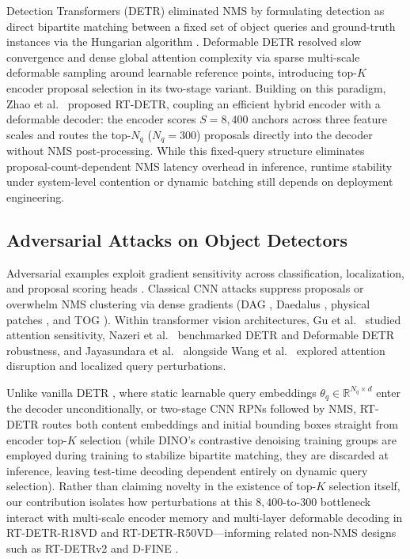 \documentclass[preprint,10pt]{elsarticle}
\begin{document}
Detection Transformers (DETR) \citep{carion2020end} eliminated NMS by formulating detection as direct bipartite matching between a fixed set of object queries and ground-truth instances via the Hungarian algorithm \citep{kuhn1955hungarian}. Deformable DETR \citep{zhu2020deformable} resolved slow convergence and dense global attention complexity via sparse multi-scale deformable sampling around learnable reference points, introducing top-$K$ encoder proposal selection in its two-stage variant. Building on this paradigm, Zhao et al.~\citep{zhao2024detrs} proposed RT-DETR, coupling an efficient hybrid encoder with a deformable decoder: the encoder scores $S = 8,400$ anchors across three feature scales and routes the top-$N_q$ ($N_q = 300$) proposals directly into the decoder without NMS post-processing. While this fixed-query structure eliminates proposal-count-dependent NMS latency overhead in inference, runtime stability under system-level contention or dynamic batching still depends on deployment engineering.

\subsection{Adversarial Attacks on Object Detectors}
Adversarial examples exploit gradient sensitivity across classification, localization, and proposal scoring heads \citep{goodfellow2014explaining, madry2018towards, carlini2017towards, li2020towards}. Classical CNN attacks suppress proposals or overwhelm NMS clustering via dense gradients (DAG \citep{xie2017adversarial}, Daedalus \citep{wang2021adversarial}, physical patches \citep{lee2019physical}, and TOG \citep{chow2020adversarial}). Within transformer vision architectures, Gu et al.~\citep{gu2022adversarial} studied attention sensitivity, Nazeri et al.~\citep{nazeri2024evaluating} benchmarked DETR and Deformable DETR robustness, and Jayasundara et al.~\citep{jayasundara2024attention} alongside Wang et al.~\citep{wang2024localized} explored attention disruption and localized query perturbations.

Unlike vanilla DETR \citep{carion2020end}, where static learnable query embeddings $\theta_q \in \mathbb{R}^{N_q \times d}$ enter the decoder unconditionally, or two-stage CNN RPNs \citep{ren2015faster} followed by NMS, RT-DETR routes both content embeddings and initial bounding boxes straight from encoder top-$K$ selection (while DINO's contrastive denoising training groups \citep{zhang2022dino} are employed during training to stabilize bipartite matching, they are discarded at inference, leaving test-time decoding dependent entirely on dynamic query selection). Rather than claiming novelty in the existence of top-$K$ selection itself, our contribution isolates how perturbations at this $8,400$-to-$300$ bottleneck interact with multi-scale encoder memory and multi-layer deformable decoding in RT-DETR-R18VD and RT-DETR-R50VD---informing related non-NMS designs such as RT-DETRv2 \citep{lv2024rt} and D-FINE \citep{peng2024dfine}.
\end{document}
